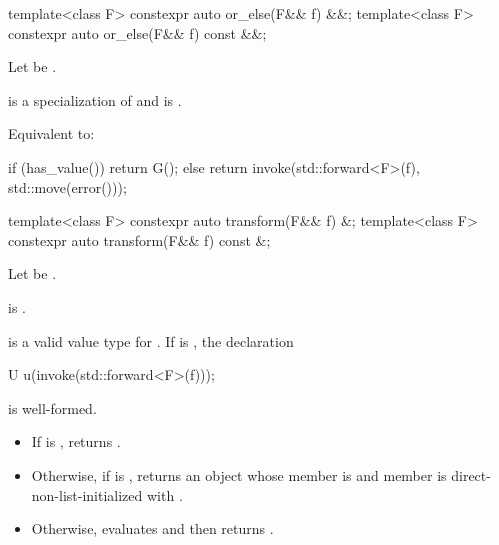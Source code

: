 %
\begin{itemdecl}
template<class F> constexpr auto or_else(F&& f) &&;
template<class F> constexpr auto or_else(F&& f) const &&;
\end{itemdecl}

\begin{itemdescr}
\pnum
Let  be
.

\pnum
\mandates
{} is a specialization of  and
 is .

\pnum
\effects
Equivalent to:
\begin{codeblock}
if (has_value())
  return G();
else
  return invoke(std::forward<F>(f), std::move(error()));
\end{codeblock}
\end{itemdescr}

%
\begin{itemdecl}
template<class F> constexpr auto transform(F&& f) &;
template<class F> constexpr auto transform(F&& f) const &;
\end{itemdecl}

\begin{itemdescr}
\pnum
Let  be .

\pnum
\constraints
{} is .

\pnum
\mandates
{} is a valid value type for . If  is
, the declaration
\begin{codeblock}
U u(invoke(std::forward<F>(f)));
\end{codeblock}
is well-formed.

\pnum
\effects
\begin{itemize}
\item
If  is , returns
.
\item
Otherwise, if  is , returns an
 object whose  member is  and
 member is direct-non-list-initialized with
.
\item
Otherwise, evaluates  and then returns
.
\end{itemize}
\end{itemdescr}

